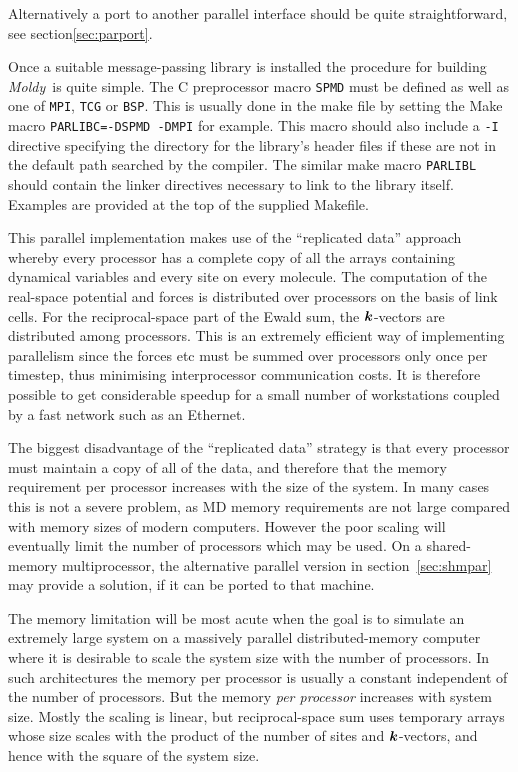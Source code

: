 \documentclass[twoside]{report}
\newcommand{\moldy}{{\em Moldy}}
\newcommand{\bm}[1]{\mbox{\boldmath \protect\(#1\protect\)}}
\begin{document}
\noindent
Alternatively a port to another parallel interface should be quite
straightforward, see section\ref{sec:parport}.

Once a suitable message-passing library is installed the procedure for
building \moldy\ is quite simple.  The C preprocessor macro
\texttt{SPMD} must be defined as well as one of \texttt{MPI},
\texttt{TCG} or \texttt{BSP}. This is usually done in the make file by
setting the Make macro \texttt{PARLIBC=-DSPMD -DMPI} for example.
This macro should also include a \texttt{-I} directive specifying the
directory for the library's header files if these are not in the
default path searched by the compiler.  The similar make macro
\texttt{PARLIBL} should contain the linker directives necessary to
link to the library itself. Examples are provided at the top of the
supplied Makefile.

This parallel implementation makes use of the ``replicated data''
approach\cite{smith:91} whereby every processor has a complete copy of
all the arrays containing dynamical variables and every site on every
molecule.  The computation of the real-space potential and forces is
distributed over processors on the basis of link cells.  For the
reciprocal-space part of the Ewald sum, the $\bm{k}$-vectors are
distributed among processors.  This is an extremely efficient way of
implementing parallelism since the forces etc must be summed over
processors only once per timestep, thus minimising interprocessor
communication costs.  It is therefore possible to get considerable
speedup for a small number of workstations coupled by a fast network
such as an Ethernet.

The biggest disadvantage of the ``replicated data'' strategy is that
every processor must maintain a copy of all of the data, and therefore
that the memory requirement per processor increases with the size of
the system.   In many cases this is not a severe problem, as MD
memory requirements are not large compared with memory sizes of modern
computers.  However the poor scaling will eventually limit the number
of processors which may be used.  On a shared-memory multiprocessor,
the alternative parallel version in section~\ref{sec:shmpar} may
provide a solution, if it can be ported to that machine.

The memory limitation will be most acute when the goal is to simulate
an extremely large system on a massively parallel distributed-memory
computer where it is desirable to scale the system size with the
number of processors.  In such architectures the memory per processor
is usually a constant independent of the number of processors. But the
memory {\em per processor}\/ increases with system size.  Mostly the
scaling is linear, but reciprocal-space sum uses temporary arrays
whose size scales with the product of the number of sites and
$\bm{k}$-vectors, and hence with the square of the system size.
\end{document}
